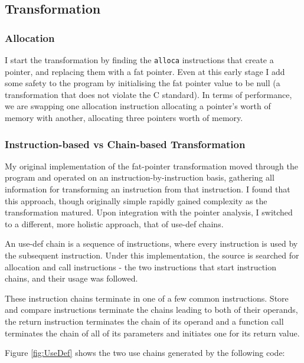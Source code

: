 \subsection{Transformation}

\subsubsection{Allocation}

I start the transformation by finding the \verb!alloca! instructions that create a pointer, and replacing them with a fat pointer.
Even at this early stage I add some safety to the program by initialising the fat pointer value to be null (a transformation that does not violate the C standard).
In terms of performance, we are swapping one allocation instruction allocating a pointer's worth of memory with another, allocating three pointers worth of memory. 

\subsubsection{Instruction-based vs Chain-based Transformation}

My original implementation of the fat-pointer transformation moved through the program and operated on an instruction-by-instruction basis, gathering all information for transforming an instruction from that instruction.
I found that this approach, though originally simple rapidly gained complexity as the transformation matured.
Upon integration with the pointer analysis, I switched to a different, more holistic approach, that of use-def chains.

An use-def chain is a sequence of instructions, where every instruction is used by the subsequent instruction.
Under this implementation, the source is searched for allocation and call instructions - the two instructions that start instruction chains, and their usage was followed.

These instruction chains terminate in one of a few common instructions. Store and compare instructions terminate the chains leading to both of their operands, the return instruction terminates the chain of its operand and a function call terminates the chain of all of its parameters and initiates one for its return value.

Figure \ref{fig:UseDef} shows the two use chains generated by the following code:

